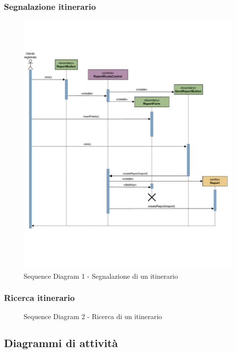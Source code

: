 \documentclass{natourDoc}
\begin{document}
\subsubsection{Segnalazione itinerario}
\begin{figure}[!htbp]
	\centering
	\includegraphics[width=\textwidth, page=1]{./diagrams/sequenceDomain-segnalazioneItinerario.pdf}
	\caption{Sequence Diagram 1 - Segnalazione di un itinerario}
\end{figure}
\FloatBarrier

\newpage
\subsubsection{Ricerca itinerario}
\begin{figure}[!htbp]
	\centering
	
	\caption{Sequence Diagram 2 - Ricerca di un itinerario}
\end{figure}
\FloatBarrier

\newpage
\subsection{Diagrammi di attività}
\end{document}
